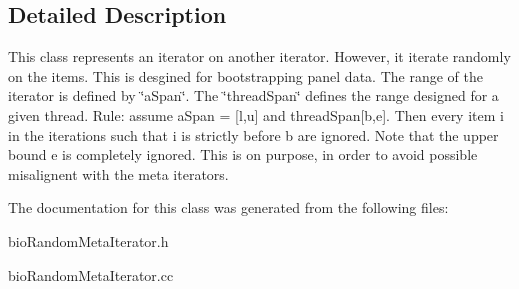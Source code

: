 \subsection{Detailed Description}
This class represents an iterator on another iterator. However, it iterate randomly on the items. This is desgined for bootstrapping panel data. The range of the iterator is defined by \char`\"{}a\+Span\char`\"{}. The \char`\"{}thread\+Span\char`\"{} defines the range designed for a given thread. Rule\+: assume a\+Span = \mbox{[}l,u\mbox{]} and thread\+Span\mbox{[}b,e\mbox{]}. Then every item i in the iterations such that i is strictly before b are ignored. Note that the upper bound e is completely ignored. This is on purpose, in order to avoid possible misalignent with the meta iterators. 

The documentation for this class was generated from the following files\+:\begin{DoxyCompactItemize}
\item 
bio\+Random\+Meta\+Iterator.\+h\item 
bio\+Random\+Meta\+Iterator.\+cc\end{DoxyCompactItemize}
